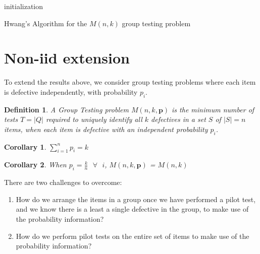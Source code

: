 \documentclass[11pt]{article}
\renewcommand{\vec}[1]{\mathbf{#1}}
\newtheorem{definition}{Definition}[section]
\newtheorem{cor}{Corollary}[section]
\begin{document}
\bigskip	
\begin{algorithm}[H]
 \SetLine %
 initialization\;
 \caption{Hwang's Algorithm for the \(M\left(n,k\right)\) group testing problem}
\end{algorithm}
\bigskip	

\section{Non-iid extension}

To extend the results above, we consider group testing problems where each item is defective independently, with probability \(p_i\). 

\begin{definition}
A Group Testing problem \( M\left(n,k,\vec{p}\right) \) is the minimum number of tests \(T = \lvert Q \rvert\) required to uniquely identify all \(k\) defectives in a set \(S\) of \(\lvert S \rvert = n \) items, when each item is defective with an independent probability \(p_i\).
\end{definition}

\begin{cor}
\(\sum_{i=1}^n p_i = k\)
\end{cor}

\begin{cor}
When \(p_i = \frac{k}{n} \text{ } \forall \text{ } i\), \( M\left(n,k,\vec{p}\right) \) = \( M\left(n,k\right) \)
\end{cor}
There are two challenges to overcome: 

\begin{enumerate}
\item How do we arrange the items in a group once we have performed a pilot test, and we know there is a least a single defective in the group, to make use of the probability information?
\item How do we perform pilot tests on the entire set of items to make use of the probability information?
\end{enumerate}
\end{document}
